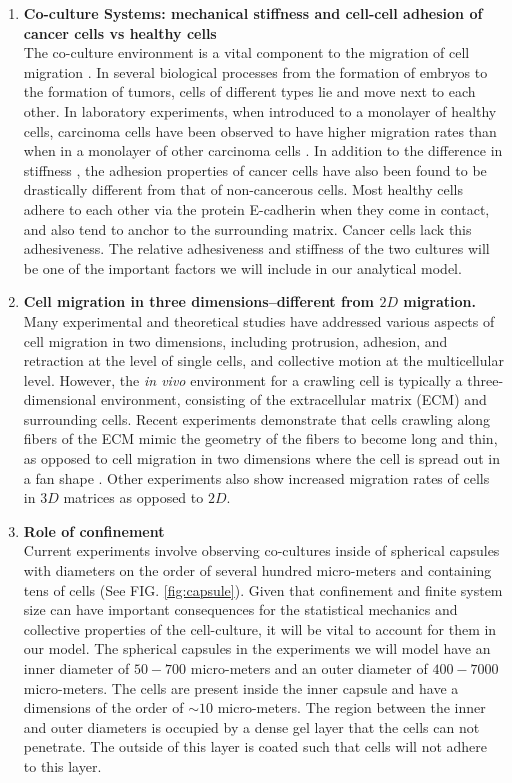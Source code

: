 \documentclass[aps,prb,twocolumn,groupedaddress,nofootinbib,floatfix]{revtex4}
\begin{document}
\begin{enumerate}

\item {\bf Co-culture Systems: mechanical stiffness and cell-cell adhesion of cancer cells vs healthy cells}\\
The co-culture environment is a vital component to the migration of cell migration \cite{Miki}.
In several biological processes from the formation of embryos to the formation of tumors, cells of different types lie and move next to each other.
In laboratory experiments, when introduced to a monolayer of healthy cells, carcinoma cells have been observed to have higher migration rates than when in a monolayer of other carcinoma cells \cite{Lee}.
In addition to the difference in stiffness \cite{Lee}, the adhesion properties of cancer cells have also been found to be drastically different from that of non-cancerous cells\cite{Jeanes}.
Most healthy cells adhere to each other via the protein E-cadherin when they come in contact, and also tend to anchor to the surrounding matrix.
Cancer cells lack this adhesiveness.
The relative adhesiveness and stiffness of the two cultures will be one of the important factors we will include in our analytical model.

\item {\bf Cell migration in three dimensions--different from $2D$ migration.}\\
Many experimental and theoretical studies have addressed various aspects of cell migration in two dimensions, including protrusion, adhesion, and retraction at the level of single cells, and collective motion at the multicellular level.
However, the {\it in vivo} environment for a crawling cell is typically a three-dimensional environment, consisting of the extracellular matrix (ECM) and surrounding cells.
Recent experiments demonstrate that cells crawling along fibers of the ECM mimic the geometry of the fibers to become long and thin, as opposed to cell migration in two dimensions where the cell is spread out in a fan shape \cite{Doyle}.
Other experiments also show increased migration rates of cells in $3D$ matrices as opposed to  $2D$\cite{Cukierman}.

\item{\bf Role of confinement}\\
Current experiments involve observing co-cultures inside of spherical capsules with diameters on the order of several hundred micro-meters and containing tens of cells\cite{Alessandri} (See FIG. \ref{fig:capsule}).
Given that confinement and finite system size can have important consequences for the statistical mechanics and collective properties of the cell-culture, it will be vital to account for them in our model.
The spherical capsules in the experiments we will model have an inner diameter of $50-700$ micro-meters and an outer diameter of $400-7000$ micro-meters.
The cells are present inside the inner capsule and have a dimensions of the order of $\sim 10$ micro-meters.
The region between the inner and outer diameters is occupied by a dense gel layer that the cells can not penetrate.
The outside of this layer is coated such that cells will not adhere to this layer. 


\end{enumerate}
\end{document}
